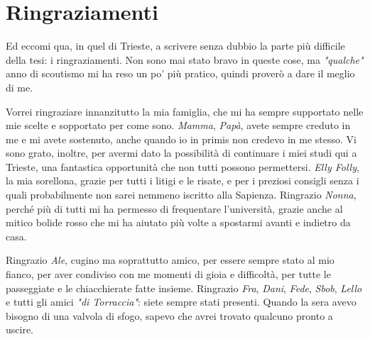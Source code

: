 \chapter*{Ringraziamenti}


Ed eccomi qua, in quel di Trieste, a scrivere senza dubbio la parte più difficile della tesi: i ringraziamenti. Non sono mai stato bravo in queste cose, ma \textit{"qualche"} anno di scoutismo mi ha reso un po' più pratico, quindi proverò a dare il meglio di me.

Vorrei ringraziare innanzitutto la mia famiglia, che mi ha sempre supportato nelle mie scelte e sopportato per come sono. \textit{Mamma}, \textit{Papà}, avete sempre creduto in me e mi avete sostenuto, anche quando io in primis non credevo in me stesso. Vi sono grato, inoltre, per avermi dato la possibilità di continuare i miei studi qui a Trieste, una fantastica opportunità che non tutti possono permettersi. \textit{Elly Folly}, la mia sorellona, grazie per tutti i litigi e le risate, e per i preziosi consigli senza i quali probabilmente non sarei nemmeno iscritto alla Sapienza. Ringrazio \textit{Nonna}, perché più di tutti mi ha permesso di frequentare l’università, grazie anche al mitico bolide rosso che mi ha aiutato più volte a spostarmi avanti e indietro da casa.

Ringrazio \textit{Ale}, cugino ma soprattutto amico, per essere sempre stato al mio fianco, per aver condiviso con me momenti di gioia e difficoltà, per tutte le passeggiate e le chiacchierate fatte insieme. Ringrazio \textit{Fra}, \textit{Dani}, \textit{Fede}, \textit{Sbob}, \textit{Lello} e tutti gli amici \textit{"di Torraccia"}: siete sempre stati presenti. Quando la sera avevo bisogno di una valvola di sfogo, sapevo che avrei trovato qualcuno pronto a uscire.

